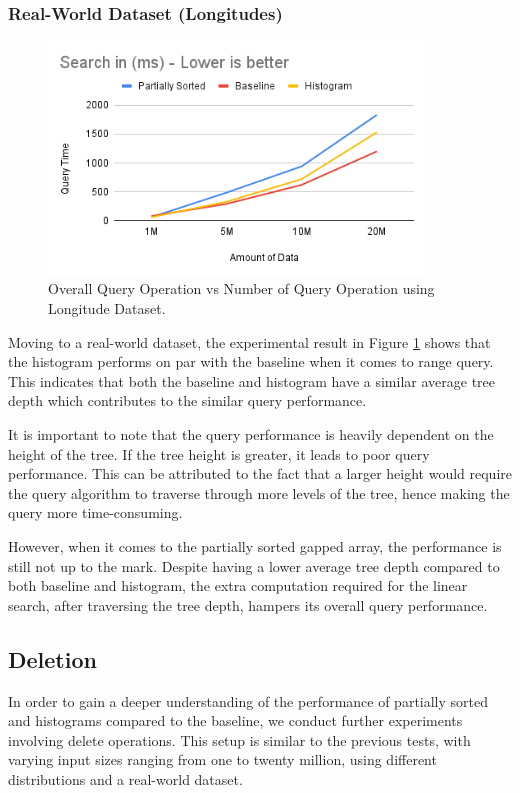 \subsubsection{Real-World Dataset (Longitudes)}
\begin{figure}[H]
    \centering
    \includegraphics[width=100mm,scale=1]{Figures/QueryLongitude.png}
    \caption{
     Overall Query Operation vs Number of Query Operation using Longitude Dataset.
    }
    \label{fig:QueryResultLongitude}
\end{figure}
Moving to a real-world dataset, the experimental result in Figure \ref{fig:QueryResultLongitude} shows that the histogram performs on par with the baseline when it comes to range query. This indicates that both the baseline and histogram have a similar average tree depth which contributes to the similar query performance.

It is important to note that the query performance is heavily dependent on the height of the tree. If the tree height is greater, it leads to poor query performance. This can be attributed to the fact that a larger height would require the query algorithm to traverse through more levels of the tree, hence making the query more time-consuming.

However, when it comes to the partially sorted gapped array, the performance is still not up to the mark. Despite having a lower average tree depth compared to both baseline and histogram, the extra computation required for the linear search, after traversing the tree depth, hampers its overall query performance.


\subsection{Deletion}
In order to gain a deeper understanding of the performance of partially sorted and histograms compared to the baseline, we conduct further experiments involving delete operations. This setup is similar to the previous tests, with varying input sizes ranging from one to twenty million, using different distributions and a real-world dataset.


